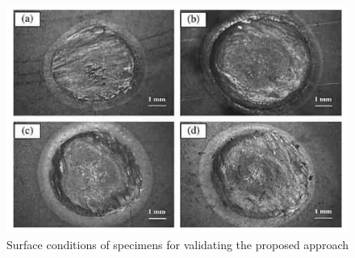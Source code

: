 \documentclass[english,ngerman]{tudscrreprt}
\begin{document}
\begin{figure}[H]
\centering
\includegraphics[scale = 1]{./Bilder/Surface conditions of specimens for validating the proposed approach.png}
\caption{Surface conditions of specimens for validating the proposed approach}\label{fgg:T}
\end{figure}
\newpage
\end{document}
